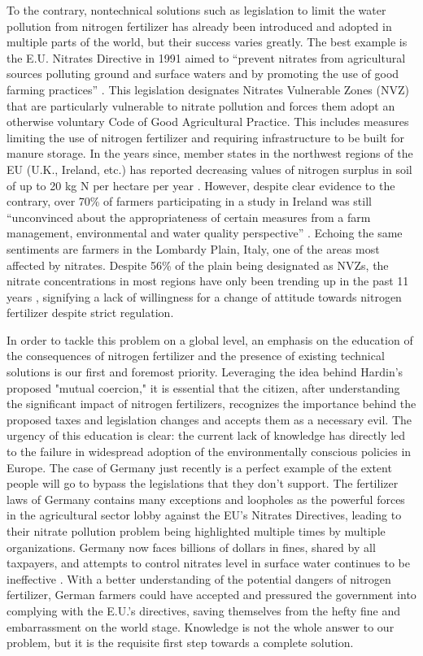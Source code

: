 \documentclass[12pt]{article}
\begin{document}
	To the contrary, nontechnical solutions such as legislation to limit the water pollution from nitrogen fertilizer has already been introduced and adopted in multiple parts of the world, but their success varies greatly. The best example is the E.U. Nitrates Directive in 1991 aimed to “prevent nitrates from agricultural sources polluting ground and surface waters and by promoting the use of good farming practices” \cite{nitratesdirective}. This legislation designates Nitrates Vulnerable Zones (NVZ) that are particularly vulnerable to nitrate pollution and forces them adopt an otherwise voluntary Code of Good Agricultural Practice. This includes measures limiting the use of nitrogen fertilizer and requiring infrastructure to be built for manure storage. In the years since, member states in the northwest regions of the EU (U.K., Ireland, etc.) has reported decreasing values of nitrogen surplus in soil of up to 20 kg N per hectare per year \cite{grisven12}. However, despite clear evidence to the contrary, over 70\% of farmers participating in a study in Ireland was still “unconvinced about the appropriateness of certain measures from a farm management, environmental and water quality perspective” \cite{buckley12}. Echoing the same sentiments are farmers in the Lombardy Plain, Italy, one of the areas most affected by nitrates. Despite 56\% of the plain being designated as NVZs, the nitrate concentrations in most regions have only been trending up in the past 11 years  \cite{mus19}, signifying a lack of willingness for a change of attitude towards nitrogen fertilizer despite strict regulation. 
	
	In order to tackle this problem on a global level, an emphasis on the education of the consequences of nitrogen fertilizer and the presence of existing technical solutions is our first and foremost priority. Leveraging the idea behind Hardin's proposed "mutual coercion," it is essential that the citizen, after understanding the significant impact of nitrogen fertilizers, recognizes the importance behind the proposed taxes and legislation changes and accepts them as a necessary evil. The urgency of this education is clear: the current lack of knowledge has directly led to the failure in widespread adoption of the environmentally conscious policies in Europe. The case of Germany just recently is a perfect example of the extent people will go to bypass the legislations that they don’t support. The fertilizer laws of Germany contains many exceptions and loopholes as the powerful forces in the agricultural sector lobby against the EU’s Nitrates Directives, leading to their nitrate pollution problem being highlighted multiple times by multiple organizations. Germany now faces billions of dollars in fines, shared by all taxpayers, and attempts to control nitrates level in surface water continues to be ineffective \cite{metaeeb}. With a better understanding of the potential dangers of nitrogen fertilizer, German farmers could have accepted and pressured the government into complying with the E.U.'s directives, saving themselves from the hefty fine and embarrassment on the world stage. Knowledge is not the whole answer to our problem, but it is the requisite first step towards a complete solution.
	
\end{document}
